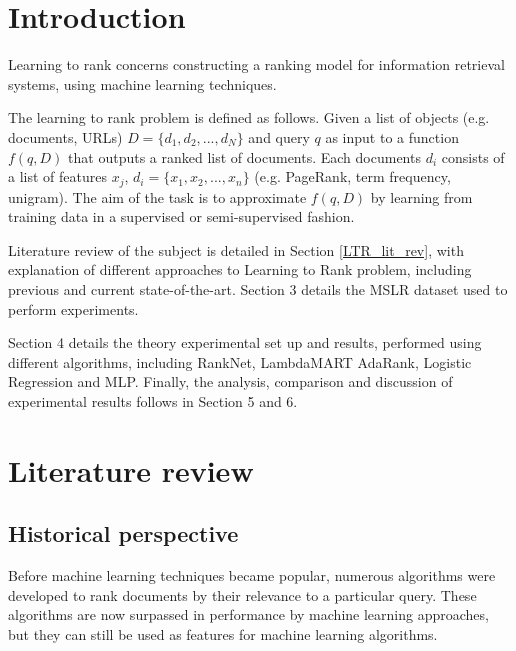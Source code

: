 \documentclass[english]{article}
\theoremstyle{definition}
\begin{document}
\begin{multicols}{2}
\section{Introduction}

Learning to rank concerns constructing a ranking model for information retrieval systems, using machine learning techniques. 

The learning to rank problem is defined as follows. Given a list of objects (e.g. documents, URLs) $D = \{d_1,d_2,...,d_N \}$ and query $q$ as input to a function $f(q,D)$ that outputs a ranked list of documents. Each documents $d_i$ consists of a list of features $x_j$, $d_i = \{x_1, x_2,...,x_n \}$ (e.g. PageRank, term frequency, unigram). The aim of the task is to approximate $f(q,D)$ by learning from training data in a supervised or semi-supervised fashion. 

Literature review of the subject is detailed in Section \ref{LTR_lit_rev}, with explanation of different approaches to Learning to Rank problem, including previous and current state-of-the-art.  Section 3 details the MSLR dataset used to perform experiments. 

Section 4 details the theory experimental set up and results, performed using different algorithms, including RankNet, LambdaMART AdaRank, Logistic Regression and MLP. Finally, the analysis, comparison and discussion of experimental results follows in Section 5 and 6.



\section{\label{LTR_lit_rev}Literature review}

\subsection{Historical perspective}

Before machine learning techniques became popular, numerous algorithms were developed to rank documents by their relevance to a particular query.  These algorithms are now surpassed in performance by machine learning approaches, but they can still be used as features for machine learning algorithms. 


\end{multicols}
\end{document}
